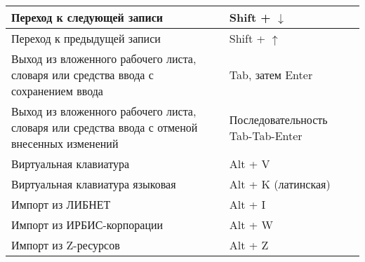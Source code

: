 \begin{longtable}{| p{7.5cm} | p{3cm} |}
	\hline
	Переход к следующей записи & Shift + $\downarrow$ \\
	\hline
	Переход к предыдущей записи & Shift + $\uparrow$ \\
	\hline
	Выход из вложенного рабочего листа, словаря или средства ввода с сохранением ввода & Tab, затем Enter \\
	\hline
	Выход из вложенного рабочего листа, словаря или средства ввода с отменой внесенных изменений & Последовательность Tab-Tab-Enter \\
	\hline
	Виртуальная клавиатура & Alt + V \\
	\hline
	Виртуальная клавиатура языковая & Alt + K (латинская) \\
	\hline
	Импорт из ЛИБНЕТ & Alt + I \\
	\hline
	Импорт из ИРБИС-корпорации & Alt + W \\
	\hline
	Импорт из Z-ресурсов & Alt + Z \\
	\hline
\end{longtable}

